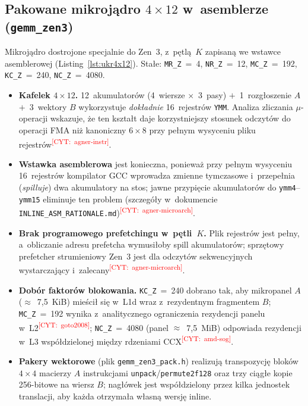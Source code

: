 \documentclass[a4paper,12pt]{book} %
\newcommand{\todocite}[1]{\textsuperscript{\textcolor{red}{[CYT:~#1]}}}
\newcommand{\kod}[1]{\texttt{#1}}
\begin{document}
\subsection{Pakowane mikrojądro $4\times12$ w~asemblerze (\kod{gemm\_zen3})}
\label{ssec:zen3}
Mikrojądro dostrojone specjalnie do Zen~3, z~pętlą~$K$ zapisaną we wstawce
asemblerowej (Listing~\ref{lst:ukr4x12}). Stałe:
\kod{MR\_Z}~=~4, \kod{NR\_Z}~=~12, \kod{MC\_Z}~=~192, \kod{KC\_Z}~=~240,
\kod{NC\_Z}~=~4080.
\begin{itemize}
\item \textbf{Kafelek $4\times12$.} 12~akumulatorów (4~wiersze $\times$~3~pasy)
  $+$~1~rozgłoszenie $A$ $+$~3~wektory $B$ wykorzystuje \emph{dokładnie}
  16~rejestrów \kod{YMM}. Analiza zliczania $\mu$-operacji wskazuje, że ten
  kształt daje korzystniejszy stosunek odczytów do operacji FMA niż kanoniczny
  $6\times8$ przy pełnym wysyceniu pliku rejestrów\todocite{agner-instr}.
\item \textbf{Wstawka asemblerowa} jest konieczna, ponieważ przy pełnym wysyceniu
  16~rejestrów kompilator GCC wprowadza zmienne tymczasowe i~przepełnia
  (\emph{spilluje}) dwa akumulatory na stos; jawne przypięcie akumulatorów do
  \kod{ymm4}--\kod{ymm15} eliminuje ten problem (szczegóły w~dokumencie
  \kod{INLINE\_ASM\_RATIONALE.md})\todocite{agner-microarch}.
\item \textbf{Brak programowego prefetchingu w~pętli~$K$.} Plik rejestrów jest
  pełny, a~obliczanie adresu prefetcha wymusiłoby spill akumulatorów; sprzętowy
  prefetcher strumieniowy Zen~3 jest dla odczytów sekwencyjnych wystarczający i~zalecany\todocite{agner-microarch}.
\item \textbf{Dobór faktorów blokowania.} \kod{KC\_Z}~=~240 dobrano tak, aby
  mikropanel $A$ ($\approx$~7,5~KiB) mieścił się w~L1d wraz z~rezydentnym
  fragmentem $B$; \kod{MC\_Z}~=~192 wynika z~analitycznego ograniczenia
  rezydencji panelu w~L2\todocite{goto2008}; \kod{NC\_Z}~=~4080 (panel
  $\approx$~7,5~MiB) odpowiada rezydencji w~L3 współdzielonej między rdzeniami
  CCX\todocite{amd-sog}.
\item \textbf{Pakery wektorowe} (plik \kod{gemm\_zen3\_pack.h}) realizują
  transpozycję bloków $4\times4$ macierzy $A$ instrukcjami
  \kod{unpack}/\kod{permute2f128} oraz trzy ciągłe kopie 256-bitowe na wiersz
  $B$; nagłówek jest współdzielony przez kilka jednostek translacji, aby każda
  otrzymała własną wersję inline.
\end{itemize}
\end{document}
